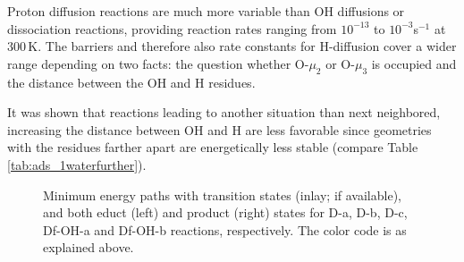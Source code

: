 \documentclass[11pt,DIV=13,BCOR=5mm,a4paper,headinclude]{scrbook}
\begin{document}
Proton diffusion reactions are much more variable than OH diffusions or dissociation reactions, providing reaction rates ranging from $10^{-13}$ to $10^{-3}$s$^{-1}$ at $300\,$K.
The barriers and therefore also rate constants for H-diffusion cover a wider range depending on two facts: the question whether O-$\mu_2$ or O-$\mu_3$ is occupied and the distance between the OH and H residues.


It was shown that reactions leading to another situation than next neighbored, increasing the distance between OH and H are less favorable since geometries with the residues farther apart are energetically less stable (compare Table \ref{tab:ads_1waterfurther}).
\begin{figure} [!ht]
\centering
{}
         \quad
{}
 \quad
{}
 \quad
{}
\caption{Minimum energy paths with transition states (inlay; if available), and both educt (left) and product (right) states for D-a, D-b, D-c, Df-OH-a and Df-OH-b reactions, respectively.
The color code is as explained above.}
       \label{mep}
\end{figure}
\end{document}
